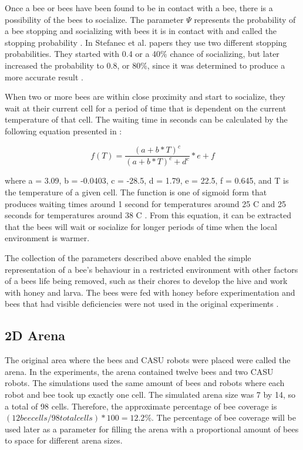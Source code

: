 \documentclass[conference,compsoc,onecolumn]{IEEEtran}
\begin{document}
Once a bee or bees have been found to be in contact with a bee, there is a possibility of the bees to socialize. The parameter $\Psi$ represents the probability of a bee stopping and socializing with bees it is in contact with and called the stopping probability \cite{Stefanc2017}. In Stefanec et al. papers they use two different stopping probabilities. They started with 0.4 or a 40\% chance of socializing, but later increased the probability to 0.8, or 80\%, since it was determined to produce a more accurate result \cite{Stefanc2017}.

When two or more bees are within close proximity and start to socialize, they wait at their current cell for a period of time that is dependent on the current temperature of that cell. The waiting time in seconds can be calculated by the following equation presented in \cite{Stefanc2017}:

\begin{equation}
	f(T) = \frac{(a + b*T)^c}{(a + b*T)^c + d^c} * e + f
\end{equation}

where a = 3.09, b = -0.0403, c = -28.5, d = 1.79, e = 22.5, f = 0.645, and T is the temperature of a given cell. The function is one of sigmoid form that produces waiting times around 1 second for temperatures around 25 \degree C and 25 seconds for temperatures around 38 \degree C \cite{Stefanc2017}. From this equation, it can be extracted that the bees will wait or socialize for longer periods of time when the local environment is warmer.

The collection of the parameters described above enabled the simple representation of a bee's behaviour in a restricted environment with other factors of a bees life being removed, such as their chores to develop the hive and work with honey and larva. The bees were fed with honey before experimentation and bees that had visible deficiencies were not used in the original experiments \cite{Stefanc2017}.

\subsection{2D Arena}

The original area where the bees and CASU robots were placed were called the arena. In the experiments, the arena contained twelve bees and two CASU robots. The simulations used the same amount of bees and robots where each robot and bee took up exactly one cell. The simulated arena size was 7 by 14, so a total of 98 cells. Therefore, the approximate percentage of bee coverage is $(12 bee cells / 98 total cells) * 100 = 12.2 \% $. The percentage of bee coverage will be used later as a parameter for filling the arena with a proportional amount of bees to space for different arena sizes. 
\end{document}
